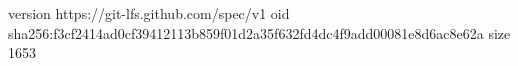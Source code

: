 version https://git-lfs.github.com/spec/v1
oid sha256:f3cf2414ad0cf39412113b859f01d2a35f632fd4dc4f9add00081e8d6ac8e62a
size 1653
